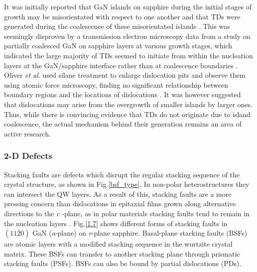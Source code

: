 It was initially reported that GaN islands on sapphire during the initial stages of growth may be misorientated with respect to one another and that TDs were generated during the coalescence of these misorientated islands \cite{Ning1996}. This was seemingly disproven by a transmission electron microscopy data from a study on partially coalesced GaN on sapphire layers at various growth stages, which indicated the large majority of TDs seemed to initiate from within the nucleation layers at the GaN/sapphire interface rather than at coalescence boundaries \cite{Moram2009}. Oliver {\it et al}. used silane treatment to enlarge dislocation pits and observe them using atomic force microscopy, finding no significant relationship between boundary regions and the locations of dislocations \cite{Oliver2008a}. It was however suggested that dislocations may arise from the overgrowth of smaller islands by larger ones. Thus, while there is convincing evidence that TDs do not originate due to island coalescence, the actual mechanism behind their generation remains an area of active research.

\subsubsection{2-D Defects}

Stacking faults are defects which disrupt the regular stacking sequence of the crystal structure, as shown in Fig.\ref{bsf_type}. In non-polar heterostructures they can intersect the QW layers. As a result of this, stacking faults are a more pressing concern than dislocations in epitaxial films grown along alternative directions to the {\it c}
-plane, as in polar materials stacking faults tend to remain in the nucleation layers \cite{Scholz2012}. Fig.\ref{1.7} shows different forms of stacking faults in $(11\bar{2}0)$ GaN ({\it a}-plane) on {\it r}-plane sapphire.  Basal-plane stacking faults  (BSFs) are atomic layers with a modified stacking sequence in the wurtzite crystal matrix. These BSFs can transfer to another stacking plane through prismatic stacking faults  (PSFs). BSFs can also be bound by partial dislocations  (PDs).


